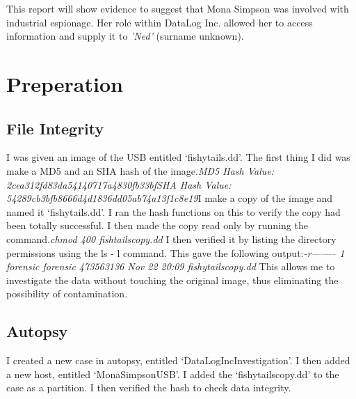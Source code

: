 \documentclass[12pt]{article}
\begin{document}
				This report will show evidence to suggest that Mona Simpson was involved with industrial espionage. Her role within DataLog Inc. allowed her to access information and supply it to \textit{'Ned'} (surname unknown).	

		\section{Preperation}
			\subsection{File Integrity}
				I was given an image of the USB entitled ‘fishytails.dd’. The first thing I did was make a MD5 and an SHA hash of the image.\newline\newline \textit{MD5 Hash Value: 2cea312fd83da54140717a4830fb33bf\newline SHA Hash Value: 54289cb3bfb8666d4d1836dd05ab74a13f1c8e19}\newline\newline I make a copy of the image and named it ‘fishytails.dd’. I ran the hash functions on this to verify the copy had been totally successful. I then made the copy read only by running the command.\newline\newline \textit{chmod 400 fishtailscopy.dd} \newline\newline I then verified it by listing the directory permissions using the ls - l command. This gave the following output:\newline\newline \textit{-r-------- 1 forensic forensic 473563136 Nov 22 20:09 fishytailscopy.dd} \newline\newline This allows me to investigate the data without touching the original image, thus eliminating the possibility of contamination.

			\subsection{Autopsy}
		
				I created a new case in autopsy, entitled ‘DataLogIncInvestigation’. I then added a new host, entitled ‘MonaSimpsonUSB’. I added the ‘fishytailscopy.dd’ to the case as a partition. I then verified the hash to check data integrity.	
\end{document}
